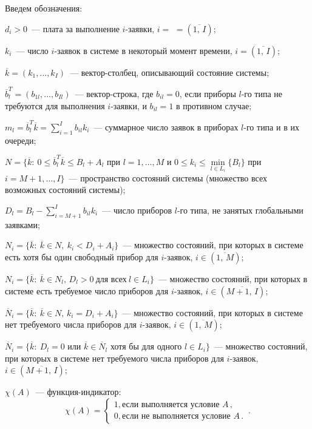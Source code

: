 \begin{multicols}{2}
  Введем обозначения:

  $d_i >0$~--- плата за выполнение $i$-заявки, $i =$\linebreak 
  $=(\overline{1,\,I})$;

  $k_i$~--- число $i$-заявок в системе в некоторый момент времени, $i =
(\overline{1,\,I})$;

  $\overline{k} = (k_1, \ldots , k_I)$~--- вектор-столбец, описы\-ва\-ющий
состояние системы;

  $\overline{b}_l^T = (b_{1l},\ldots , b_{Il})$~---  вектор-строка, где
$b_{il}=0$, если приборы $l$-го типа не требуются для выполнения $i$-заявки,
и $b_{il}=1$ в противном случае;

  $m_l = \overline{b}_l^T \overline{k} = \sum\limits_{i=1}^I b_{il} k_i$~--- суммарное
число заявок в приборах $l$-го типа и в их очереди;

  $N = \{ \overline{k}:\ 0\leq \overline{b}_l^T \overline{k} \leq B_l+A_l$ при
$l=1,\ldots , M$ и $0\leq k_i\leq \underset{l\in L_i}{\min} \{B_l\}$ при $i=M+1,\ldots
, I\}$~--- пространство состояний системы (множество всех возможных
состояний системы);

  $D_l = B_l - \sum\limits_{i=M+1}^I b_{il} k_i$~--- число приборов $l$-го типа, не
занятых глобальными заявками;

  $N_i = \{ \overline{k}:\ \overline{k}\in N,\ k_i < D_i+A_i\}$~--- множество
состояний, при которых в системе есть хотя бы один свободный прибор для
$i$-заявок, $i\in (\overline{1,\,M})$;

  $N_i = \{\overline{k}:\ \overline{k}\in N_l, \, D_l>0\ \mbox{для всех}\ l\in
L_i\}$~---  множество состояний, при которых в сис\-те\-ме есть требуемое число
приборов для $i$-заявок, $i\in (\overline{M+1,\,I})$;

  $\overline{N}_i = \{\overline{k}:\ \overline{k}\in N,\,k_i = D_i+A_i\}$~---
множество состояний, при которых в сис\-те\-ме нет требуемого числа приборов
для $i$-заявок, $i\in (\overline{1,\,M})$;

  $\overline{N}_i = \{\overline{k}:\ D_l=0$ или
$\overline{k}\in\overline{N}_l$ хотя бы для одного $l\in L_i\}$~---
множество состояний, при которых в сис\-те\-ме нет требуемого чис\-ла приборов
для $i$-заявок, $i\in (\overline{M+1,\,I})$;

$\chi (A)$~--- функция-индикатор: 
  $$
  \chi (A) = \begin{cases}
  1, \mbox{если выполняется условие\ } A\,,\\
  0, \mbox{если не выполняется условие\ } A \,.
  \end{cases}\,.
  $$


\end{multicols}
